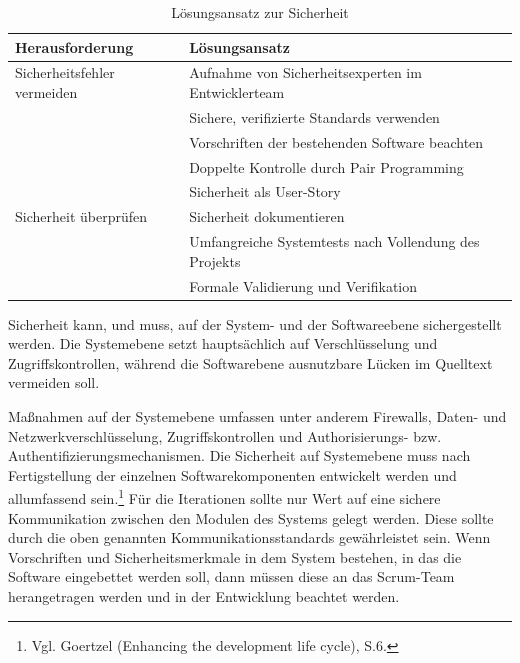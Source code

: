                 \begin{table}[H]
                    \begin{tabularx}{\textwidth}{|X|X|}
                        \hline
                        Herausforderung & Lösungsansatz \\
                        \hline
                        Sicherheitsfehler vermeiden & Aufnahme von Sicherheitsexperten im Entwicklerteam \\
                        & Sichere, verifizierte Standards verwenden \\
                        & Vorschriften der bestehenden Software beachten \\
                        & Doppelte Kontrolle durch Pair Programming \\
                        & Sicherheit als User-Story \\
                        \vspace{0.5\baselineskip} Sicherheit überprüfen & \vspace{0.5\baselineskip} Sicherheit dokumentieren \\
                        & Umfangreiche Systemtests nach Vollendung des Projekts \\
                        & Formale Validierung und Verifikation \\
                        \hline
                    \end{tabularx}
                    \caption{Lösungsansatz zur Sicherheit}
                \end{table}

                Sicherheit kann, und muss, auf der System- und der Softwareebene sichergestellt werden. Die Systemebene setzt hauptsächlich auf Verschlüsselung und Zugriffskontrollen, während die Softwarebene ausnutzbare Lücken im Quelltext vermeiden soll.

                Maßnahmen auf der Systemebene umfassen unter anderem Firewalls, Daten- und Netzwerkverschlüsselung, Zugriffskontrollen und Authorisierungs- bzw. Authentifizierungsmechanismen. Die Sicherheit auf Systemebene muss nach Fertigstellung der einzelnen Softwarekomponenten entwickelt werden und allumfassend sein.\footnote{Vgl. Goertzel (Enhancing the development life cycle), S.6.}
                Für die Iterationen sollte nur Wert auf eine sichere Kommunikation zwischen den Modulen des Systems gelegt werden. Diese sollte durch die oben genannten Kommunikationsstandards gewährleistet sein. Wenn Vorschriften und Sicherheitsmerkmale in dem System bestehen, in das die Software eingebettet werden soll, dann müssen diese an das Scrum-Team herangetragen werden und in der Entwicklung beachtet werden.

